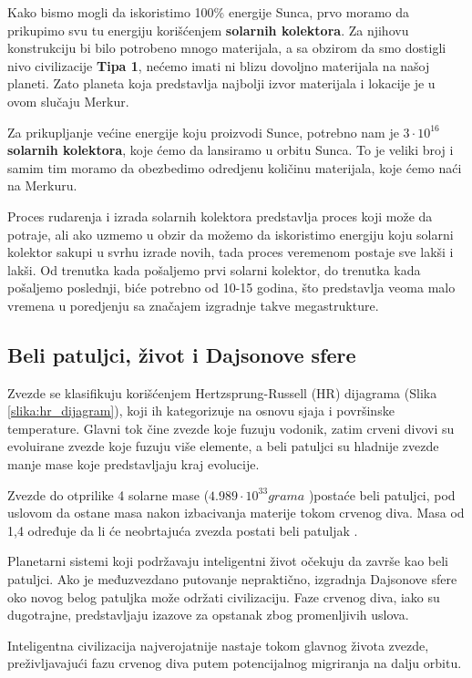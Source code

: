 \documentclass[a4paper]{article}
\begin{document}
Kako bismo mogli da iskoristimo 100\% energije Sunca, prvo moramo da prikupimo svu tu energiju korišćenjem \textbf{solarnih kolektora}. Za njihovu konstrukciju bi bilo potrobeno mnogo materijala, a sa obzirom da smo dostigli nivo civilizacije \textbf{Tipa 1}, nećemo imati ni blizu dovoljno materijala na našoj planeti. Zato planeta koja predstavlja najbolji izvor materijala i lokacije je u ovom slučaju Merkur.

Za prikupljanje većine energije koju proizvodi Sunce, potrebno nam je $3 \cdot 10^{16}$ \textbf{solarnih kolektora}, koje ćemo da lansiramo u orbitu Sunca. To je veliki broj i samim tim moramo da obezbedimo odredjenu količinu materijala, koje ćemo naći na Merkuru. 


Proces rudarenja i izrada solarnih kolektora predstavlja proces koji može da potraje, ali ako uzmemo u obzir da možemo da iskoristimo energiju koju solarni kolektor sakupi u svrhu izrade novih, tada proces veremenom postaje sve lakši i lakši. Od trenutka kada pošaljemo prvi solarni kolektor, do trenutka kada pošaljemo poslednji, biće potrebno od 10-15 godina, što predstavlja veoma malo vremena u poredjenju sa značajem izgradnje takve megastrukture. 



\subsection{Beli patuljci, život i Dajsonove sfere}
Zvezde se klasifikuju korišćenjem Hertzsprung-Russell (HR) dijagrama (Slika \ref{slika:hr_dijagram}), koji ih kategorizuje na osnovu sjaja i površinske temperature. Glavni tok čine zvezde koje fuzuju vodonik, zatim crveni divovi su evoluirane zvezde koje fuzuju više elemente, a beli patuljci su hladnije zvezde manje mase koje predstavljaju kraj evolucije.

Zvezde do otprilike 4 solarne mase ($4.989 \cdot 10^{33} grama $ )postaće beli patuljci, pod uslovom da ostane masa nakon izbacivanja materije tokom crvenog diva. Masa od 1,4 određuje da li će neobrtajuća zvezda postati beli patuljak \cite{whitedwarfs}.

Planetarni sistemi koji podržavaju inteligentni život očekuju da završe kao beli patuljci. Ako je međuzvezdano putovanje nepraktično, izgradnja Dajsonove sfere oko novog belog patuljka može održati civilizaciju. Faze crvenog diva, iako su dugotrajne, predstavljaju izazove za opstanak zbog promenljivih uslova.

Inteligentna civilizacija najverojatnije nastaje tokom glavnog života zvezde, preživljavajući fazu crvenog diva putem potencijalnog migriranja na dalju orbitu.
\end{document}
